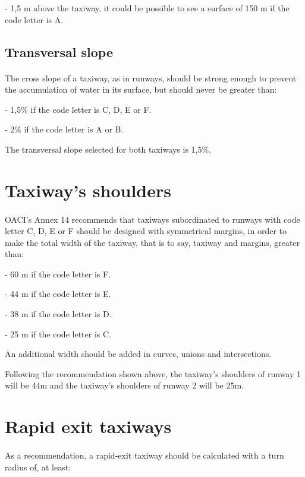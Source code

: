 		-	1,5 m above the taxiway, it could be possible to see a surface of 150 m if the code letter is A.
	
		\subsection{Transversal slope} 
		\paragraph{}The cross slope of a taxiway, as in runways, should be strong enough to prevent the accumulation of water in its surface, but should never be greater than:
		
		-	1,5\% if the code letter is C, D, E or F.
		
		-	2\% if the code letter is A or B.
		
		The transversal slope selected for both taxiways is 1,5\%.
	
	\section{Taxiway's shoulders}
	\paragraph{}OACI’s Annex 14 recommends that taxiways subordinated to runways with code letter C, D, E or F should be designed with symmetrical margins, in order to make the total width of the taxiway, that is to say, taxiway and margins, greater than:
	
	-	60 m if the code letter is F.
	
	-	44 m if the code letter is E.
	
	-	38 m if the code letter is D.
	
	-	25 m if the code letter is C.
	
	An additional width should be added in curves, unions and intersections.
	
	Following the recommendation shown above, the taxiway's shoulders of runway 1 will be 44m and the taxiway's shoulders of runway 2 will be 25m.
	
	
	\section{Rapid exit taxiways}
		\paragraph{}As a recommendation, a rapid-exit taxiway should be calculated with a turn radius of, at least:
		
